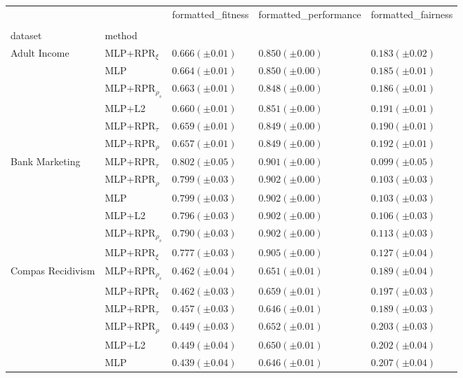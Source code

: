 \begin{tabular}{lllll}
\toprule
 &  & formatted_fitness & formatted_performance & formatted_fairness \\
 &  &  &  &  \\
dataset & method &  &  &  \\
\midrule
\multirow[t]{6}{*}{Adult Income} & MLP+RPR$_{\xi}$ & $0.666 (\pm0.01)$ & $0.850 (\pm0.00)$ & $0.183 (\pm0.02)$ \\
 & MLP & $0.664 (\pm0.01)$ & $0.850 (\pm0.00)$ & $0.185 (\pm0.01)$ \\
 & MLP+RPR$_{\rho_s}$ & $0.663 (\pm0.01)$ & $0.848 (\pm0.00)$ & $0.186 (\pm0.01)$ \\
 & MLP+L2 & $0.660 (\pm0.01)$ & $0.851 (\pm0.00)$ & $0.191 (\pm0.01)$ \\
 & MLP+RPR$_{\tau}$ & $0.659 (\pm0.01)$ & $0.849 (\pm0.00)$ & $0.190 (\pm0.01)$ \\
 & MLP+RPR$_{\rho}$ & $0.657 (\pm0.01)$ & $0.849 (\pm0.00)$ & $0.192 (\pm0.01)$ \\
\cline{1-5}
\multirow[t]{6}{*}{Bank Marketing} & MLP+RPR$_{\tau}$ & $0.802 (\pm0.05)$ & $0.901 (\pm0.00)$ & $0.099 (\pm0.05)$ \\
 & MLP+RPR$_{\rho}$ & $0.799 (\pm0.03)$ & $0.902 (\pm0.00)$ & $0.103 (\pm0.03)$ \\
 & MLP & $0.799 (\pm0.03)$ & $0.902 (\pm0.00)$ & $0.103 (\pm0.03)$ \\
 & MLP+L2 & $0.796 (\pm0.03)$ & $0.902 (\pm0.00)$ & $0.106 (\pm0.03)$ \\
 & MLP+RPR$_{\rho_s}$ & $0.790 (\pm0.03)$ & $0.902 (\pm0.00)$ & $0.113 (\pm0.03)$ \\
 & MLP+RPR$_{\xi}$ & $0.777 (\pm0.03)$ & $0.905 (\pm0.00)$ & $0.127 (\pm0.04)$ \\
\cline{1-5}
\multirow[t]{6}{*}{Compas Recidivism} & MLP+RPR$_{\rho_s}$ & $0.462 (\pm0.04)$ & $0.651 (\pm0.01)$ & $0.189 (\pm0.04)$ \\
 & MLP+RPR$_{\xi}$ & $0.462 (\pm0.03)$ & $0.659 (\pm0.01)$ & $0.197 (\pm0.03)$ \\
 & MLP+RPR$_{\tau}$ & $0.457 (\pm0.03)$ & $0.646 (\pm0.01)$ & $0.189 (\pm0.03)$ \\
 & MLP+RPR$_{\rho}$ & $0.449 (\pm0.03)$ & $0.652 (\pm0.01)$ & $0.203 (\pm0.03)$ \\
 & MLP+L2 & $0.449 (\pm0.04)$ & $0.650 (\pm0.01)$ & $0.202 (\pm0.04)$ \\
 & MLP & $0.439 (\pm0.04)$ & $0.646 (\pm0.01)$ & $0.207 (\pm0.04)$ \\
\cline{1-5}

\end{tabular}
